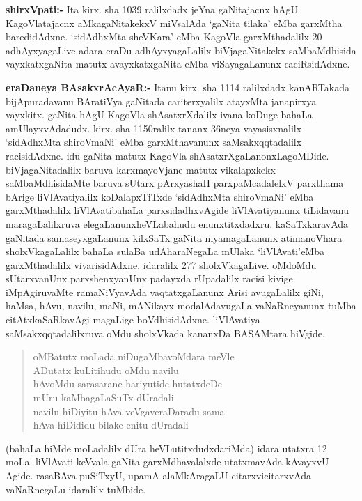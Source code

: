 \textbf{shirxVpati:-} Ita kirx. sha {\rm 1039} ralilxdadx jeYna gaNitajacnx hAgU KagoVlatajacnx aMkagaNitakekxV miVsalAda `gaNita tilaka' eMba garxMtha baredidAdxne. `sidAdhxMta sheVKara' eMba KagoVla garxMthadalilx {\rm 20} adhAyxyagaLive adara eraDu adhAyxyagaLalilx biVjagaNitakekx saMbaMdhisida vayxkatxgaNita matutx avayxkatxgaNita eMba viSayagaLanunx caciRsidAdxne.

\textbf{eraDaneya BAsakxrAcAyaR:-} Itanu kirx. sha {\rm 1114} ralilxdadx kanARTakada bijApuradavanu BAratiVya gaNitada cariterxyalilx atayxMta janapirxya vayxkitx. gaNita hAgU KagoVla shAsatxrXdalilx ivana koDuge bahaLa amUlayxvAdadudx. kirx. sha {\rm 1150}ralilx tananx {\rm 36}neya vayasisxnalilx `sidAdhxMta shiroVmaNi' eMba garxMthavanunx saMsakxqqtadalilx racisidAdxne. idu gaNita matutx KagoVla shAsatxrXgaLanonxLagoMDide. biVjagaNitadalilx baruva karxmayoVjane matutx vikalapxkekx saMbaMdhisidaMte baruva sUtarx pArxyashaH parxpaMcadalelxV parxthama bArige liVlAvatiyalilx koDalapxTiTxde `sidAdhxMta shiroVmaNi' eMba garxMthadalilx liVlAvati\break bahaLa parxsidadhxvAgide liVlAvatiyanunx tiLidavanu maragaLalilxruva elegaLanunx\break heVLabahudu enunxtitxdadxru. kaSaTxkaravAda gaNitada samaseyxgaLanunx kilxSaTx gaNita niyama\-gaLanunx atimanoVhara sholxVkagaLalilx bahaLa sulaBa udAharaNegaLa mUlaka `liVlAvati'\break eMba garxMthadalilx vivarisidAdxne. idaralilx {\rm 277} sholxVkagaLive. oMdoMdu sUtarxvanUnx parxshenxyanUnx padayxda rUpadalilx racisi kivige iMpAgiruvaMte ramaNiVyavAda vaqtatxgaLanunx Arisi avugaLalilx giNi, haMsa, hAvu, navilu, maNi, mANikayx modalAdavugaLa vaNaRneyanunx tuMba citAtxkaSaRkavAgi magaLige boVdhisidAdxne. liVlAvatiya saMsakxqqta\-dalilxruva oMdu sholxVkada kananxDa BASAMtara hiVgide.
\begin{verse}
oMBatutx moLada niDugaMbavoMdara meVle\\
ADutatx kuLitihudu oMdu navilu\\
hAvoMdu sarasarane hariyutide hutatxdeDe\\
mUru kaMbagaLaSuTx dUradali\\
navilu hiDiyitu hAva veVgaveraDaradu sama\\
hAva hiDididu bilake enitu dUradali
\end{verse}

(bahaLa hiMde moLadalilx dUra heVLutitxdudxdariMda) idara utatxra {\rm 12} moLa. liVlAvati keVvala gaNita garxMdhavalalxde utatxmavAda kAvayxvU Agide. rasaBAva puSiTxyU, upamA alaMkAragaLU citarxvicitarxvAda vaNaRnegaLu idaralilx tuMbide.

